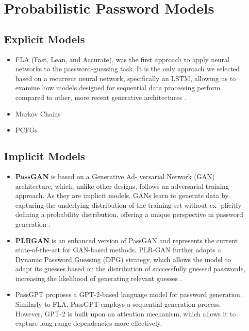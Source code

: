 \documentclass[english,noexaminfo,a4paper,oneside, binding = 0.6cm]{sapthesis}
\begin{document}
\section{Probabilistic Password Models}
\subsection{Explicit Models}
\begin{itemize}
  \item FLA \cite{ref:fla} (Fast, Lean, and Accurate), was the first
approach to apply neural networks to the password-guessing
task. It is the only approach we selected based on a
recurrent neural network, specifically an LSTM, allowing
us to examine how models designed for sequential data
processing perform compared to other, more recent generative
architectures \cite{ref:maya}. 
  \item Markov Chains
  \item PCFGs
\end{itemize}
\subsection{Implicit Models}
\begin{itemize}
  \item \textbf { PassGAN }  \cite{ref:passgan} is based on a Generative Ad-
versarial Network (GAN) architecture, which, unlike other
designs, follows an adversarial training approach. As they are
implicit models, GANs learn to generate data by capturing
the underlying distribution of the training set without ex-
plicitly defining a probability distribution, offering a unique
perspective in password generation \cite{ref:maya}.
  \item \textbf { PLRGAN } is an enhanced version of
PassGAN and represents the current state-of-the-art for
GAN-based methods. PLR-GAN further adopts a Dynamic
Password Guessing (DPG) strategy, which allows the model
to adapt its guesses based on the distribution of successfully
guessed passwords, increasing the likelihood of generating
relevant guesses \cite{ref:maya}.
  \item PassGPT proposes a GPT-2-based language
model for password generation. Similarly to FLA, PassGPT
employs a sequential generation process. However, GPT-2
is built upon an attention mechanism, which allows it to
capture long-range dependencies more effectively. \cite{ref:maya}
\end{itemize}
\end{document}
